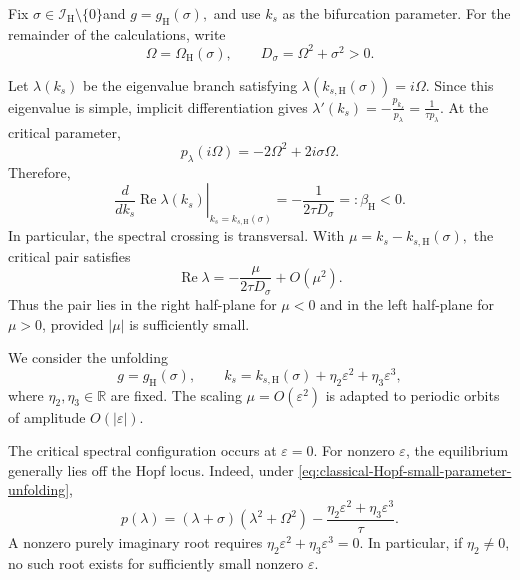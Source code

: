 \documentclass[11pt,reqno]{amsart}
\theoremstyle{plain}
\theoremstyle{definition}
\theoremstyle{remark}
\begin{document}

Fix
$
\sigma\in\mathcal I_{\mathrm H}\setminus\{0\}$and
$
g=g_{\mathrm H}(\sigma),
$
and use $k_s$ as the bifurcation parameter. For the remainder
of the calculations, write
\begin{equation}
\label{eq:classical-frequency-short}
\Omega=\Omega_{\mathrm H}(\sigma),\qquad
D_\sigma=\Omega^2+\sigma^2>0.
\end{equation}

Let $\lambda(k_s)$ be the eigenvalue branch satisfying
$\lambda(k_{s,\mathrm H}(\sigma))=i\Omega$. Since this eigenvalue
is simple, implicit differentiation gives
$
\lambda'(k_s)
=
-\frac{p_{k_s}}{p_\lambda}
=
\frac1{\tau p_\lambda}.
$
At the critical parameter,
\[
p_\lambda(i\Omega)
=
-2\Omega^2+2i\sigma\Omega.
\]
Therefore,
\begin{equation}
\label{eq:classical-Hopf-transversality-derivative}
\left.
\frac{d}{dk_s}\operatorname{Re}\lambda(k_s)
\right|_{k_s=k_{s,\mathrm H}(\sigma)}
=
-\frac1{2\tau D_\sigma}
=: \beta_{\mathrm H}<0.
\end{equation}
In particular, the spectral crossing is transversal.
With
$
\mu=k_s-k_{s,\mathrm H}(\sigma),
$
the critical pair satisfies
\[
\operatorname{Re}\lambda
=
-\frac{\mu}{2\tau D_\sigma}+O(\mu^2).
\]
Thus the pair lies in the right half-plane for $\mu<0$ and
in the left half-plane for $\mu>0$, provided $|\mu|$ is
sufficiently small.

We consider the unfolding
\begin{equation}
\label{eq:classical-Hopf-small-parameter-unfolding}
g=g_{\mathrm H}(\sigma),\qquad
k_s=k_{s,\mathrm H}(\sigma)
+\eta_2\varepsilon^2+\eta_3\varepsilon^3,
\end{equation}
where $\eta_2,\eta_3\in\mathbb R$ are fixed. The scaling
$\mu=O(\varepsilon^2)$ is adapted to periodic orbits of
amplitude $O(|\varepsilon|)$.

The critical spectral configuration occurs at $\varepsilon=0$.
For nonzero $\varepsilon$, the equilibrium generally lies off
the Hopf locus. Indeed, under
\eqref{eq:classical-Hopf-small-parameter-unfolding},
\[
p(\lambda)
=
(\lambda+\sigma)(\lambda^2+\Omega^2)
-\frac{\eta_2\varepsilon^2+\eta_3\varepsilon^3}{\tau}.
\]
A nonzero purely imaginary root requires
$\eta_2\varepsilon^2+\eta_3\varepsilon^3=0$.
In particular, if $\eta_2\neq0$, no such root exists for
sufficiently small nonzero $\varepsilon$.
\end{document}
